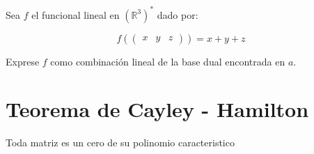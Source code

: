 		\begin{ejercicio}
			Sea $f$ el funcional lineal en $\left( \mathbb{R}^3 \right)^*$ dado por:

			\begin{equation*}
				f(\begin{pmatrix} x & y & z \end{pmatrix}) = x + y + z
			\end{equation*}

			Exprese $f$ como combinación lineal de la base dual encontrada en $a$.
		\end{ejercicio}


\section{Teorema de Cayley - Hamilton}

	\begin{definicion}
		Toda matriz es un cero de su polinomio caracteristico
	\end{definicion}


